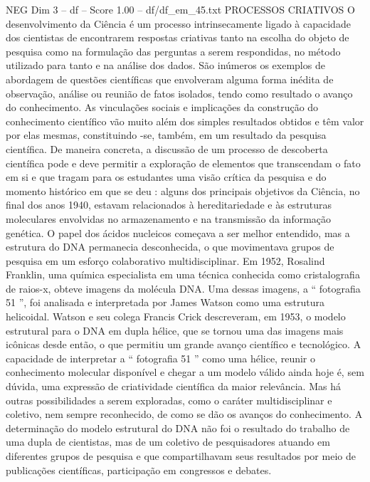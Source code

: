 \begin{textsample}{NEG Dim 3 – df – Score 1.00 – df/df\_em\_45.txt}  \label{ex:f3_neg_165}
PROCESSOS CRIATIVOS O desenvolvimento da Ciência é um processo intrinsecamente ligado à capacidade dos cientistas de encontrarem respostas criativas tanto na escolha do objeto de pesquisa como na formulação das perguntas a serem respondidas, no método utilizado para tanto e na análise dos dados.
São inúmeros os exemplos de abordagem de questões científicas que envolveram alguma forma inédita de observação, análise ou reunião de fatos isolados, tendo como resultado o avanço do conhecimento.
As vinculações sociais e implicações da construção do conhecimento científico vão muito além dos simples resultados obtidos e têm valor por elas mesmas, constituindo -se, também, em um resultado da pesquisa científica.
De maneira concreta, a discussão de um processo de descoberta científica pode e deve permitir a exploração de elementos que transcendam o fato em si e que tragam para os estudantes uma visão crítica da pesquisa e do momento histórico em que se deu : alguns dos principais objetivos da Ciência, no final dos anos 1940, estavam relacionados à hereditariedade e às estruturas moleculares envolvidas no armazenamento e na transmissão da informação genética.
O papel dos ácidos nucleicos começava a ser melhor entendido, mas a estrutura do DNA permanecia desconhecida, o que movimentava grupos de pesquisa em um esforço colaborativo multidisciplinar.
Em 1952, Rosalind Franklin, uma química especialista em uma técnica conhecida como cristalografia de raios-x, obteve imagens da molécula DNA.
Uma dessas imagens, a “ fotografia 51 ”, foi analisada e interpretada por James Watson como uma estrutura helicoidal.
Watson e seu colega Francis Crick descreveram, em 1953, o modelo estrutural para o DNA em dupla hélice, que se tornou uma das imagens mais icônicas desde então, o que permitiu um grande avanço científico e tecnológico.
A capacidade de interpretar a “ fotografia 51 ” como uma hélice, reunir o conhecimento molecular disponível e chegar a um modelo válido ainda hoje é, sem dúvida, uma expressão de criatividade científica da maior relevância.
Mas há outras possibilidades a serem exploradas, como o caráter multidisciplinar e coletivo, nem sempre reconhecido, de como se dão os avanços do conhecimento.
A determinação do modelo estrutural do DNA não foi o resultado do trabalho de uma dupla de cientistas, mas de um coletivo de pesquisadores atuando em diferentes grupos de pesquisa e que compartilhavam seus resultados por meio de publicações científicas, participação em congressos e debates.

\end{textsample}
